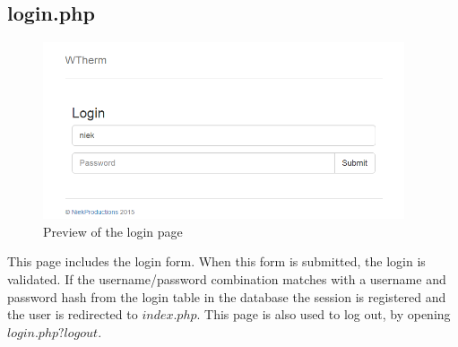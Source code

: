 \documentclass[12pt,a4paper,final]{report}
\begin{document}
\subsection*{login.php}
\begin{figure}[H]
  \begin{center}
      \includegraphics[width=0.95\textwidth]{ui/login}
  \end{center}
  \caption{Preview of the login page}
\end{figure}
This page includes the login form. When this form is submitted, the login is validated. If the username/password combination matches with a username and password hash from the login table in the database the session is registered and the user is redirected to $index.php$. This page is also used to log out, by opening $login.php?logout$.
\end{document}
